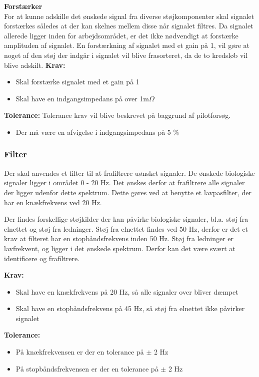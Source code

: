 \textbf{Forstærker}\\
For at kunne adskille det ønskede signal fra diverse støjkomponenter skal signalet forstærkes således at der kan skelnes mellem disse når signalet filtres. Da signalet allerede ligger inden for arbejdsområdet, er det ikke nødvendigt at forstærke amplituden af signalet. En forstærkning af signalet med et gain på 1, vil gøre at noget af den støj der indgår i signalet vil blive frasorteret, da de to kredsløb vil blive adskilt. 
\textbf{Krav:}
\begin{itemize}
\item Skal forstærke signalet med et gain på 1
\item Skal have en indgangsimpedans på over 1m$\Omega$
\end{itemize}

\textbf{Tolerance:}
Tolerance krav vil blive beskrevet på baggrund af pilotforsøg.
\begin{itemize}
\item Der må være en afvigelse i indgangsimpedans på 5 \%
\end{itemize}

\subsubsection{Filter}
Der skal anvendes et filter til at frafiltrere uønsket signaler. De ønskede biologiske signaler ligger i området 0 - 20 Hz. Det ønskes derfor at frafiltrere alle signaler der ligger udenfor dette spektrum. Dette gøres ved at benytte et lavpasfilter, der har en knækfrekvens ved 20 Hz. 

Der findes forskellige støjkilder der kan påvirke biologiske signaler, bl.a. støj fra elnettet og støj fra ledninger. Støj fra elnettet findes ved 50 Hz, derfor er det et krav at filteret har en stopbåndsfrekvens inden 50 Hz. Støj fra ledninger er lavfrekvent, og ligger i det ønskede spektrum. Derfor kan det være svært at identificere og frafiltrere. 

\textbf{Krav:}
\begin{itemize}
\item Skal have en knækfrekvens på 20 Hz, så alle signaler over bliver dæmpet
\item Skal have en stopbåndsfrekvens på 45 Hz, så støj fra elnettet ikke påvirker signalet
\end{itemize}

\textbf{Tolerance:}
\begin{itemize}
\item På knækfrekvensen er der en tolerance på $\pm$ 2 Hz
\item På stopbåndsfrekvensen er der en tolerance på $\pm$ 2 Hz
\end{itemize}

